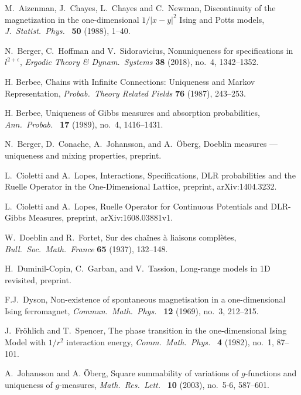 \documentclass[11pt, a4paper]{amsart}
\theoremstyle{definition}
\theoremstyle{remark}
\begin{document}
\begin{thebibliography}{999}

 M.\ Aizenman, J.\ Chayes, L.\ Chayes and C.\ Newman,
  Discontinuity of the magnetization in the one-dimensional
  $1/|x-y|^2$ Ising and Potts models, {\em J.\  Statist.\ Phys.\  } {\bf
    50} (1988), 1--40.
    
  N.\ Berger, C.\ Hoffman and V.\ Sidoravicius,
  Nonuniqueness for specifications in $l^{2+\epsilon}$,
  {\em Ergodic Theory \& Dynam.\ Systems} {\bf 38}
  (2018), no.\ 4, 1342--1352.   

 H. Berbee, Chains with Infinite Connections:
  Uniqueness and Markov Representation, {\em Probab.\ Theory Related
    Fields} {\bf 76} (1987), 243--253.
 
 H. Berbee, Uniqueness of Gibbs measures and
  absorption probabilities, {\em Ann.\ Probab.\ } {\bf 17} (1989),
  no.\ 4, 1416--1431.
 
N.\ Berger, D.\ Conache, A.\ Johansson, and A.\ \"Oberg, Doeblin measures --- uniqueness and mixing properties,
preprint. 
 
 L.\ Cioletti and A.\ Lopes, Interactions,
  Specifications, DLR probabilities and the Ruelle Operator in the
  One-Dimensional Lattice, preprint, arXiv:1404.3232.
 
 L.\ Cioletti and A.\ Lopes, Ruelle Operator for
  Continuous Potentials and DLR-Gibbs Measures, preprint,
  arXiv:1608.03881v1.
  
 W.\ Doeblin and R.\ Fortet, Sur des cha{\^i}nes
  {\`a} liaisons compl{\`e}tes, {\em Bull.\ Soc.\ Math.\ France} {\bf
    65} (1937), 132--148.
  
H.\ Duminil-Copin, C.\ Garban, and V.\ Tassion, Long-range models in 1D revisited, preprint.

 F.J.\ Dyson, Non-existence of spontaneous
  magnetisation in a one-dimensional Ising ferromagnet, {\em Commun.\
    Math.\ Phys.\ } {\bf 12} (1969), no.\ 3, 212--215.  

 
 J.\ Fr\"ohlich and T.\ Spencer, The phase transition in
  the one-dimensional Ising Model with $1/r^2$ interaction energy,
  {\em Comm.\ Math.\ Phys.\ } {\bf 4} (1982), no.\ 1, 87--101.

 A.\ Johansson and A. \"Oberg, Square summability of
  variations of $g$-functions and uniqueness of $g$-measures, {\em
    Math.\ Res.\ Lett.\ } {\bf 10} (2003), no.\ 5-6, 587--601.
    

\end{thebibliography}
\end{document}

